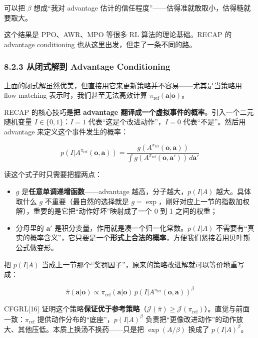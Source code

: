\documentclass[
  chinese,
]{ctexart}
\providecommand{\tightlist}{%
  \setlength{\itemsep}{0pt}\setlength{\parskip}{0pt}}
\begin{document}
可以把 \(\beta\) 想成``我对 advantage
估计的信任程度''------估得准就敢取小，估得糙就要取大。

这个结果是 PPO、AWR、MPO 等很多 RL 算法的理论基础。RECAP 的 advantage
conditioning 也从这里出发，但走了一条不同的路。

\subsubsection{8.2.3 从闭式解到 Advantage
Conditioning}\label{ux4eceux95edux5f0fux89e3ux5230-advantage-conditioning}

上面的闭式解虽然优美，但直接用它来更新策略并不容易------尤其是当策略用
flow matching 表示时，我们甚至无法高效计算
\(\pi_\text{ref}(\mathbf{a}|\mathbf{o})\)。

RECAP 的核心技巧是\textbf{把 advantage
翻译成一个虚拟事件的概率}。引入一个二元随机变量
\(I \in \{0,1\}\)：\(I=1\) 代表``这是个改进动作''，\(I=0\)
代表``不是''。然后用 advantage 来定义这个事件发生的概率：

\[
p(I | A^{\pi_\text{ref}}(\mathbf{o}, \mathbf{a})) = \frac{g(A^{\pi_\text{ref}}(\mathbf{o}, \mathbf{a}))}{\int g(A^{\pi_\text{ref}}(\mathbf{o}, \mathbf{a}')) \, d\mathbf{a}'}
\]

读这个式子时只需要把握两点：

\begin{itemize}
\tightlist
\item
  \(g\) 是\textbf{任意单调递增函数}------advantage
  越高，分子越大，\(p(I|A)\) 越大。具体取什么 \(g\)
  不重要（最自然的选择就是
  \(g=\exp\)，刚好对应上一节的指数加权解），重要的是它把``动作好坏''映射成了一个
  0 到 1 之间的权重；
\item
  分母里的 \(\mathbf{a}'\)
  是积分变量，作用就是凑一个归一化常数。\(p(I|A)\)
  不需要有``真实的概率含义''，它只要是一个\textbf{形式上合法的概率}，方便我们紧接着用贝叶斯公式做变形。
\end{itemize}

把 \(p(I|A)\)
当成上一节那个``奖罚因子''，原来的策略改进解就可以等价地重写成：

\[
\hat{\pi}(\mathbf{a}|\mathbf{o}) \propto \pi_\text{ref}(\mathbf{a}|\mathbf{o}) \, p(I | A^{\pi_\text{ref}}(\mathbf{o}, \mathbf{a}))^\beta
\]

CFGRL{[}16{]}
证明这个策略\textbf{保证优于参考策略}（\(\mathcal{J}(\hat{\pi}) \geq \mathcal{J}(\pi_\text{ref})\)）。直觉与前面一致：\(\pi_\text{ref}\)
提供动作分布的``底座''，\(p(I|A)^\beta\)
负责把``更像改进动作''的动作放大、其他压低。本质上换汤不换药------只是把
\(\exp(A/\beta)\) 换成了 \(p(I|A)^\beta\)。
\end{document}
